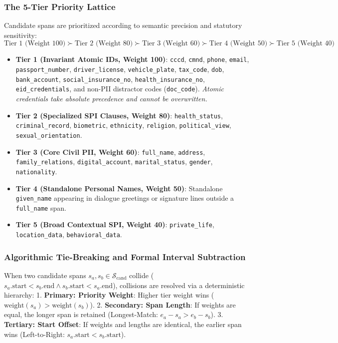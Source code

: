 \documentclass[
]{article}
\providecommand{\tightlist}{%
  \setlength{\itemsep}{0pt}\setlength{\parskip}{0pt}}
\begin{document}
\subsubsection{The 5-Tier Priority
Lattice}\label{the-5-tier-priority-lattice}

Candidate spans are prioritized according to semantic precision and
statutory sensitivity:
\[\text{Tier 1 (Weight 100)} \succ \text{Tier 2 (Weight 80)} \succ \text{Tier 3 (Weight 60)} \succ \text{Tier 4 (Weight 50)} \succ \text{Tier 5 (Weight 40)}\]

\begin{itemize}
\tightlist
\item
  \textbf{Tier 1 (Invariant Atomic IDs, Weight 100)}: \texttt{cccd},
  \texttt{cmnd}, \texttt{phone}, \texttt{email},
  \texttt{passport\_number}, \texttt{driver\_license},
  \texttt{vehicle\_plate}, \texttt{tax\_code}, \texttt{dob},
  \texttt{bank\_account}, \texttt{social\_insurance\_no},
  \texttt{health\_insurance\_no}, \texttt{eid\_credentials}, and non-PII
  distractor codes (\texttt{doc\_code}). \emph{Atomic credentials take
  absolute precedence and cannot be overwritten.}
\item
  \textbf{Tier 2 (Specialized SPI Clauses, Weight 80)}:
  \texttt{health\_status}, \texttt{criminal\_record},
  \texttt{biometric}, \texttt{ethnicity}, \texttt{religion},
  \texttt{political\_view}, \texttt{sexual\_orientation}.
\item
  \textbf{Tier 3 (Core Civil PII, Weight 60)}: \texttt{full\_name},
  \texttt{address}, \texttt{family\_relations},
  \texttt{digital\_account}, \texttt{marital\_status}, \texttt{gender},
  \texttt{nationality}.
\item
  \textbf{Tier 4 (Standalone Personal Names, Weight 50)}: Standalone
  \texttt{given\_name} appearing in dialogue greetings or signature
  lines outside a \texttt{full\_name} span.
\item
  \textbf{Tier 5 (Broad Contextual SPI, Weight 40)}:
  \texttt{private\_life}, \texttt{location\_data},
  \texttt{behavioral\_data}.
\end{itemize}

\subsubsection{Algorithmic Tie-Breaking and Formal Interval
Subtraction}\label{algorithmic-tie-breaking-and-formal-interval-subtraction}

When two candidate spans \(s_a, s_b \in \mathcal{S}_{\text{cand}}\)
collide
(\(s_a.\text{start} < s_b.\text{end} \land s_b.\text{start} < s_a.\text{end}\)),
collisions are resolved via a deterministic hierarchy: 1.
\textbf{Primary: Priority Weight}: Higher tier weight wins
(\(\text{weight}(s_a) > \text{weight}(s_b)\)). 2. \textbf{Secondary:
Span Length}: If weights are equal, the longer span is retained
(Longest-Match: \(e_a - s_a > e_b - s_b\)). 3. \textbf{Tertiary: Start
Offset}: If weights and lengths are identical, the earlier span wins
(Left-to-Right: \(s_a.\text{start} < s_b.\text{start}\)).
\end{document}
